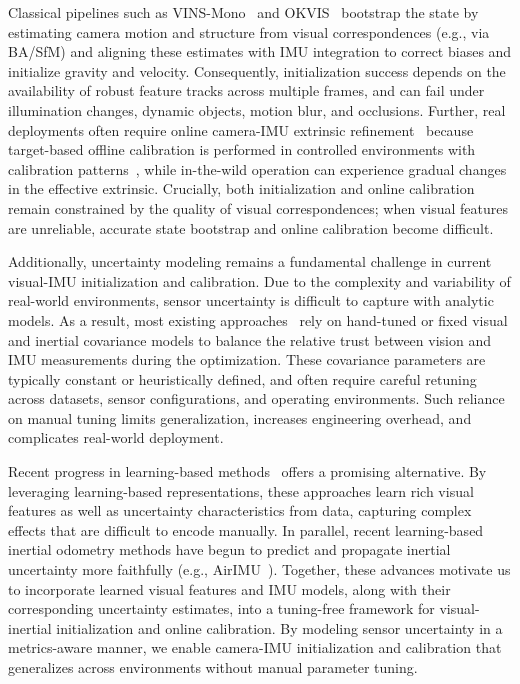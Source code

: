 Classical pipelines such as VINS-Mono~\cite{qin2018vins} and OKVIS~\cite{leutenegger2015keyframe} bootstrap the state by estimating camera motion and structure from visual correspondences (e.g., via BA/SfM) and aligning these estimates with IMU integration to correct biases and initialize gravity and velocity. 
Consequently, initialization success depends on the availability of robust feature tracks across multiple frames, and can fail under illumination changes, dynamic objects, motion blur, and occlusions.
Further, real deployments often require online camera-IMU extrinsic refinement~\cite{li2023stereo} because target-based offline calibration is performed in controlled environments with calibration patterns~\cite{furgale2013unified}, while in-the-wild operation can experience gradual changes in the effective extrinsic. 
Crucially, both initialization and online calibration remain constrained by the quality of visual correspondences; when visual features are unreliable, accurate state bootstrap and online calibration become difficult.

Additionally, uncertainty modeling remains a fundamental challenge in current visual-IMU initialization and calibration.
Due to the complexity and variability of real-world environments, sensor uncertainty is difficult to capture with analytic models.
As a result, most existing approaches~\cite{qin2018vins, geneva2020openvins} rely on hand-tuned or fixed visual and inertial covariance models to balance the relative trust between vision and IMU measurements during the optimization.
These covariance parameters are typically constant or heuristically defined, and often require careful retuning across datasets, sensor configurations, and operating environments.
Such reliance on manual tuning limits generalization, increases engineering overhead, and complicates real-world deployment.

Recent progress in learning-based methods~\cite{qiu2025mac, qiu2023airimu} offers a promising alternative.
By leveraging learning-based representations, these approaches learn rich visual features as well as uncertainty characteristics from data, capturing complex effects that are difficult to encode manually.
In parallel, recent learning-based inertial odometry methods have begun to predict and propagate inertial uncertainty more faithfully (e.g., AirIMU~\cite{qiu2023airimu}).
Together, these advances motivate us to incorporate learned visual features and IMU models, along with their corresponding uncertainty estimates, into a tuning-free framework for visual-inertial initialization and online calibration.
By modeling sensor uncertainty in a metrics-aware manner, we enable camera-IMU initialization and calibration that generalizes across environments without manual parameter tuning.

